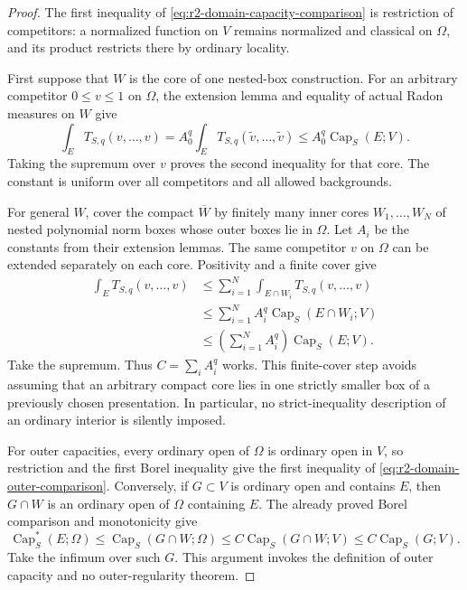 \documentclass[11pt,a4paper]{article}
\numberwithin{equation}{section}
\theoremstyle{definition}
\theoremstyle{remark}
\begin{document}
\begin{proof}
The first inequality of \eqref{eq:r2-domain-capacity-comparison}
is restriction of competitors: a normalized function on $V$ remains
normalized and classical on $\Omega$, and its product restricts
there by ordinary locality.

First suppose that $W$ is the core of one nested-box construction.
For an arbitrary competitor $0\leq v\leq1$ on $\Omega$, the extension
lemma and equality of actual Radon measures on $W$ give
\[
 \int_E T_{S,q}(v,\ldots,v)
 =A_0^q\int_E T_{S,q}(\widetilde v,\ldots,\widetilde v)
 \leq A_0^q\operatorname{Cap}_S(E;V).
\]
Taking the supremum over $v$ proves the second inequality for that
core. The constant is uniform over all competitors and all allowed
backgrounds.

For general $W$, cover the compact $\overline W$ by finitely many
inner cores $W_1,\ldots,W_N$ of nested polynomial norm boxes whose
outer boxes lie in $\Omega$. Let $A_i$ be the constants from their
extension lemmas. The same competitor $v$ on $\Omega$ can be
extended separately on each core. Positivity and a finite cover give
\[
 \begin{split}
 \int_E T_{S,q}(v,\ldots,v)
 &\leq\sum_{i=1}^N\int_{E\cap W_i}T_{S,q}(v,\ldots,v)\\
 &\leq\sum_{i=1}^NA_i^q\operatorname{Cap}_S(E\cap W_i;V)\\
 &\leq\left(\sum_{i=1}^NA_i^q\right)
                                 \operatorname{Cap}_S(E;V).
 \end{split}
\]
Take the supremum. Thus $C=\sum_iA_i^q$ works. This finite-cover
step avoids assuming that an arbitrary compact core lies in one
strictly smaller box of a previously chosen presentation. In
particular, no strict-inequality description of an ordinary interior
is silently imposed.

For outer capacities, every ordinary open of $\Omega$ is ordinary
open in $V$, so restriction and the first Borel inequality give the
first inequality of \eqref{eq:r2-domain-outer-comparison}. Conversely,
if $G\subset V$ is ordinary open and contains $E$, then $G\cap W$
is an ordinary open of $\Omega$ containing $E$. The already proved
Borel comparison and monotonicity give
\[
 \operatorname{Cap}_S^*(E;\Omega)
 \leq\operatorname{Cap}_S(G\cap W;\Omega)
 \leq C\operatorname{Cap}_S(G\cap W;V)
 \leq C\operatorname{Cap}_S(G;V).
\]
Take the infimum over such $G$. This argument invokes the definition
of outer capacity and no outer-regularity theorem.
\end{proof}
\end{document}
